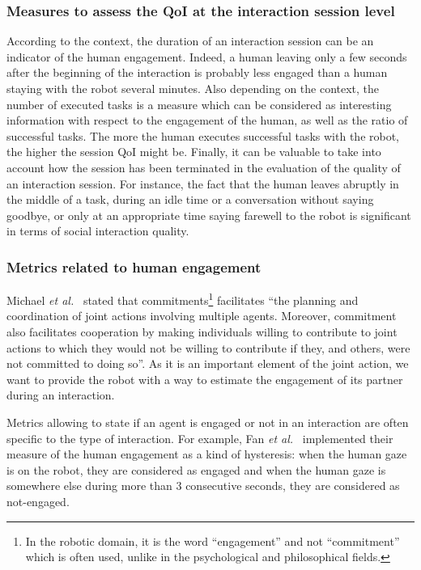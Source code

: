 \documentclass[a4paper,11pt,twoside]{StyleThese}
\begin{document}
\subsubsection{Measures to assess the QoI at the interaction session level}\label{subsec:m_intersess}
According to the context, the duration of an interaction session can be an indicator of the human engagement. Indeed, a human leaving only a few seconds after the beginning of the interaction is probably less engaged than a human staying with the robot several minutes. Also depending on the context, the number of executed tasks is a measure which can be considered as interesting information with respect to the engagement of the human, as well as the ratio of successful tasks. The more the human executes successful tasks with the robot, the higher the session QoI might be. Finally, it can be valuable to take into account how the session has been terminated in the evaluation of the quality of an interaction session. For instance, the fact that the human leaves abruptly in the middle of a task, during an idle time or a conversation without saying goodbye, or only at an appropriate time saying farewell to the robot is significant in terms of social interaction quality.

\subsubsection{Metrics related to human engagement}\label{subsec:m_engag}
Michael \textit{et al.}~\cite{michael2016} stated that commitments\footnote{In the robotic domain, it is the word ``engagement'' and not ``commitment'' which is often used, unlike in the psychological and philosophical fields.} facilitates ``the planning and coordination of joint actions involving multiple agents. Moreover, commitment also facilitates cooperation by making individuals willing to contribute to joint actions to which they would not be willing to contribute if they, and others, were not committed to doing so''. As it is an important element of the joint action, we want to provide the robot with a way to estimate the engagement of its partner during an interaction. 

Metrics allowing to state if an agent is engaged or not in an interaction are often specific to the type of interaction. For example, Fan \textit{et al.}~\cite{fan2017} implemented their measure of the human engagement as a kind of hysteresis: when the human gaze is on the robot, they are considered as engaged and when the human gaze is somewhere else during more than 3 consecutive seconds, they are considered as not-engaged. 
\end{document}
